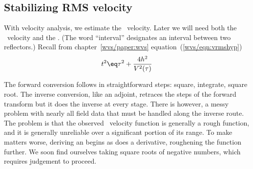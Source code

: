 \subsection{Stabilizing RMS velocity}
\par
{}
With velocity analysis, we estimate the \RMS\ velocity.
Later we will need both the \RMS\ velocity and the .
(The word ``interval'' designates an interval between two reflectors.)
Recall from chapter~\ref{wvs/paper:wvs} equation~(\ref{wvs/eqn:vrmshyp})
$$
t^2 \eq \tau^2 + \frac{4h^2}{V^2(\tau)}  \nonumber
$$
\par
The forward conversion follows 
in straightforward steps: square, integrate, square root.
The inverse conversion, like an adjoint,
retraces the steps of the forward transform
but it does the inverse at every stage.
There is however,
a messy problem with nearly all field data
that must be handled along the inverse route.
The problem is that the observed \RMS\ velocity function
is generally a rough function,
and it is generally unreliable over a significant portion of its range.
To make matters worse,
deriving an  begins as does a derivative,
roughening the function further.
We soon find ourselves taking square roots of negative numbers,
which requires judgement to proceed.
\begin{comment}
The technique used in \texttt{vint2rms()} \vpageref{/prog:vint2rms}
is to average the squared interval velocity
in ever expanding neighborhoods until there are no longer
any negative squared interval velocities.
As long as we are restricting $v^2$ from being negative,
it is easy to restrict it to be above some allowable velocity,
say {\tt vminallow}.
Figures~\ref{fig:rufsmo} and~\ref{fig:vrmsint}
were derived from the velocity scans in Figure~\ref{fig:slowfit}. %
\activeplot{rufsmo}{width=5.00in,height=2.5in}{ER}{
	Left is the raw \RMS\ velocity.
	Right is a superposition of \RMS\ velocities,
	the raw one,
	and one constrained to have realistic interval velocities.
	}%
Figure~\ref{fig:rufsmo} shows the \RMS\ velocity before and after
a trip backward and forward through routine~\texttt{vint2rms()} \vpageref{/prog:vint2rms}.
The interval velocity associated with the smoothed velocity
is in figure~\ref{fig:vrmsint}.
	

\activesideplot{vrmsint}{width=2.50in,height=2.5in}{ER}{
	Interval velocity associated with the smoothed
	\RMS\ velocity of Figure~\protect\ref{fig:rufsmo}.
	Pushbutton allows experimentation with {\tt vminallow}.
	}
\end{comment}
